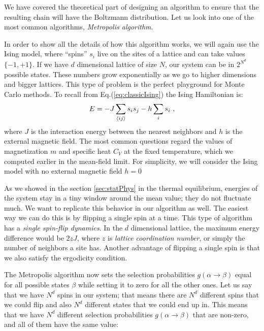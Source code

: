 \par
We have covered the theoretical part of designing an algorithm to ensure that the resulting chain will have the Boltzmann distribution. Let us look into one of the most common algorithms, \textit{Metropolis algorithm}.
\par
In order to show all the details of how this algorithm works, we will again use the Ising model, where ``spins'' $s_i$ live on the sites of a lattice and can take values $\{ -1, +1\}$. If we have $d$ dimensional lattice of size $N$, our system can be in $2^{N^d}$ possible states. These numbers grow exponentially as we go to higher dimensions and bigger lattices. This type of problem is the perfect playground for Monte Carlo methods. To recall from Eq.(\ref{eq:classicIsing}) the Ising Hamiltonian is:
\begin{equation}
	E = -J \sum_{\langle i j \rangle} s_i s_j - h \sum_i s_i \ ,
	\label{eq:classicIsing2}
\end{equation}
where $J$ is the interaction energy between the nearest neighbors and $h$ is the external magnetic field. The most common questions regard the values of magnetization $m$ and specific heat $C_V$ at the fixed temperature, which we computed earlier in the mean-field limit. For simplicity, we will consider the Ising model with no external magnetic field $h=0$
\par
As we showed in the section \ref{sec:statPhys} in the thermal equilibrium, energies of the system stay in a tiny window around the mean value; they do not fluctuate much. We want to replicate this behavior in our algorithm as well. The easiest way we can do this is by flipping a single spin at a time. This type of algorithm has a \textit{single spin-flip dynamics}. In the $d$ dimensional lattice, the maximum energy difference would be $2zJ$, where $z$ is \textit{lattice coordination number}, or simply the number of neighbors a site has. Another advantage of flipping a single spin is that we also satisfy the ergodicity condition.
\par
The Metropolis algorithm now sets the selection probabilities $g(\alpha \rightarrow \beta)$ equal for all possible states $\beta$ while setting it to zero for all the other ones. Let us say that we have $N^d$ spins in our system; that means there are $N^d$ different spins that we could flip and also $N^d$ different states that we could end up in. This means that we have $N^d$ different selection probabilities $g(\alpha \rightarrow \beta)$ that are non-zero, and all of them have the same value:
